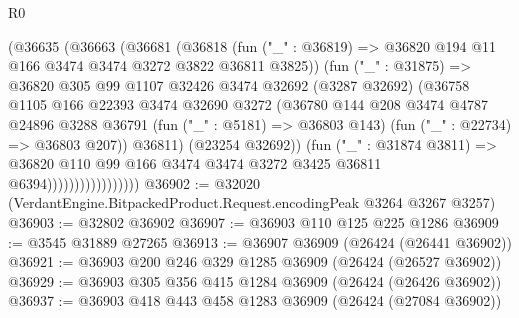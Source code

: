 \begin{lexlean}{R0}
\begin{coremodule}
                              (@36635
                                (@36663
                                  (@36681
                                    (@36818
                                      (fun ("_" : @36819) =>
                                      @36820 @194 @11 @166 @3474 @3474 @3272 @3822 @36811 @3825))
                                    (fun ("_" : @31875) =>
                                    @36820
                                      @305
                                      @99
                                      @1107
                                      @32426
                                      @3474
                                      @32692
                                      (@3287 @32692)
                                      (@36758
                                        @1105
                                        @166
                                        @22393
                                        @3474
                                        @32690
                                        @3272
                                        (@36780
                                          @144
                                          @208
                                          @3474
                                          @4787
                                          @24896
                                          @3288
                                          @36791
                                          (fun ("_" : @5181) => @36803 @143)
                                          (fun ("_" : @22734) => @36803 @207))
                                        @36811)
                                      (@23254 @32692))
                                    (fun ("_" : @31874 @3811) =>
                                    @36820
                                      @110
                                      @99
                                      @166
                                      @3474
                                      @3474
                                      @3272
                                      @3425
                                      @36811
                                      @6394)))))))))))))))))
@36902 := @32020 (VerdantEngine.BitpackedProduct.Request.encodingPeak @3264 @3267 @3257)
@36903 := @32802 @36902
@36907 := @36903 @110 @125 @225 @1286
@36909 := @3545 @31889 @27265
@36913 := @36907 @36909 (@26424 (@26441 @36902))
@36921 := @36903 @200 @246 @329 @1285 @36909 (@26424 (@26527 @36902))
@36929 := @36903 @305 @356 @415 @1284 @36909 (@26424 (@26426 @36902))
@36937 := @36903 @418 @443 @458 @1283 @36909 (@26424 (@27084 @36902))

\end{coremodule}
\end{lexlean}
